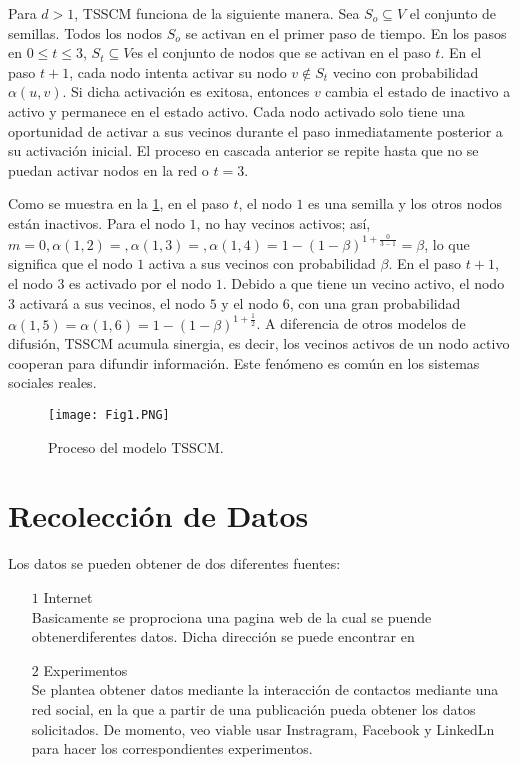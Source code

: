 \documentclass{article}
\begin{document}
Para $d > 1$, TSSCM funciona de la siguiente manera. Sea $S_o \subseteq V$ el conjunto de semillas. Todos los nodos $S_o$ se activan en el primer paso de tiempo. En los pasos en $0\leq t \leq 3$, $S_t \subseteq V $es el conjunto de nodos que se activan en el paso $t$. En el paso $t + 1$, cada nodo intenta activar su nodo $v\not\in S_t$ vecino con probabilidad $\alpha(u, v)$. Si dicha activación es exitosa, entonces $v$ cambia el estado de inactivo a activo y permanece en el estado activo. Cada nodo activado solo tiene una oportunidad de activar a sus vecinos durante el paso inmediatamente posterior a su activación inicial. El proceso en cascada anterior se repite hasta que no se puedan activar nodos en la red o $t = 3$. 

Como se muestra en la \ref{Fig:01}, en el paso $t$, el nodo $1$ es una semilla y los otros nodos están inactivos. Para el nodo $1$, no hay vecinos activos; así, $m = 0, \alpha(1,2) =, \alpha(1,3) =, \alpha(1,4) = 1 - (1 - \beta)^{1+\frac{0}{3-1}} = \beta$, lo que significa que el nodo $1$ activa a sus vecinos con probabilidad $\beta$. En el paso $t + 1$, el nodo $3$ es activado por el nodo $1$. Debido a que tiene un vecino activo, el nodo 3 activará a sus vecinos, el nodo $5$ y el nodo $6$, con una gran probabilidad $\alpha(1,5) = \alpha(1,6) = 1 - (1 - \beta)^{1+\frac{1}{2}}$. A diferencia de otros modelos de difusión, TSSCM acumula sinergia, es decir, los vecinos activos de un nodo activo cooperan para difundir información. Este fenómeno es común en los sistemas sociales reales.


\begin{figure}[h]
	\centering
	\texttt{[image: Fig1.PNG]}
	\label{Fig:01}
	\caption{Proceso del modelo TSSCM.}
\end{figure}

\newpage
\section{Recolección de Datos}
 Los datos se pueden obtener de dos diferentes fuentes: 
 \begin{itemize}
 	\item[$1$] Internet\\ 
 	Basicamente se proprociona una pagina web de la cual se puende obtenerdiferentes datos. Dicha dirección se puede encontrar en \cite{data:01} 
 	\item[$2$] Experimentos\\
 	Se plantea obtener datos mediante la interacción de contactos mediante una red social, en la que a partir de una publicación pueda obtener los datos solicitados. 
 	De momento, veo viable usar Instragram, Facebook y LinkedLn para hacer los correspondientes experimentos.
 \end{itemize}
\end{document}

